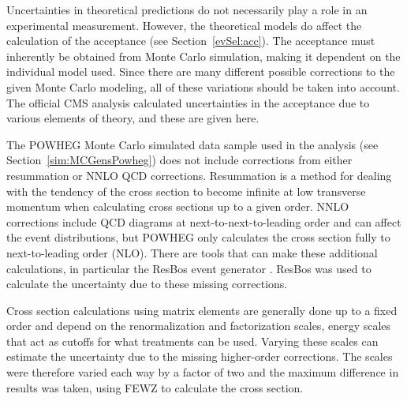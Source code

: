 

Uncertainties in theoretical predictions do not 
necessarily play a role in an experimental measurement.  
However, the theoretical models do affect the 
calculation of the acceptance (see Section~\ref{evSel:acc}).  
The acceptance must inherently be obtained from 
Monte Carlo simulation, making it dependent on the 
individual model used.  
Since there are many different possible corrections 
to the given Monte Carlo modeling, 
all of these variations should be taken into account.  
The official CMS \Zee analysis calculated \cite{CMSWZ} 
uncertainties in the acceptance due to 
various elements of theory, 
and these are given here.  




The POWHEG \cite{powheg} Monte Carlo simulated data sample used in the analysis 
(see Section~\ref{sim:MCGensPowheg}) 
does not include corrections from either resummation or 
NNLO QCD corrections.  
Resummation is a method for dealing with 
the tendency of the cross section 
to become infinite at low transverse momentum 
when calculating cross sections up to a given order.  
NNLO corrections include QCD diagrams at next-to-next-to-leading 
order and can affect the event distributions, 
but POWHEG only calculates the cross section 
fully to next-to-leading order (NLO).  
There are tools that can make these additional calculations, 
in particular the ResBos event generator \cite{resbos}. %
ResBos was used to 
calculate the uncertainty due to these missing corrections.  



Cross section calculations using matrix elements 
are generally done up to a fixed order 
and depend on the renormalization and factorization scales, %
energy scales that act as cutoffs for what 
treatments can be used.  
Varying these scales can estimate the uncertainty due 
to the missing higher-order %
corrections. 
The scales were therefore varied each way by a factor of two 
and the maximum difference in results was taken, 
using FEWZ \cite{FEWZ2} to calculate the cross section.  %


